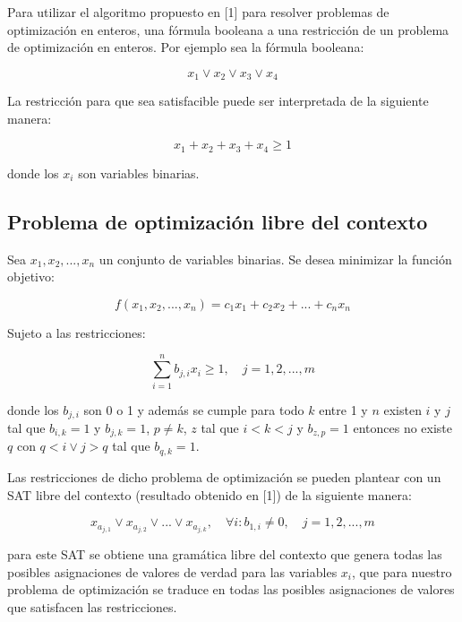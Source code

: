\documentclass{article}
\begin{document}
Para utilizar el algoritmo propuesto en [1] para resolver problemas de optimización en enteros, una fórmula booleana a una restricción de un problema
de optimización en enteros. Por ejemplo sea la fórmula booleana:

\begin{equation}
    x_1 \lor x_2  \lor x_3 \lor x_4
\end{equation}

La restricción para que sea satisfacible puede ser interpretada de la siguiente manera:

\begin{equation}
    x_1 + x_2 + x_3 + x_4 \geq 1
\end{equation}

donde los $x_i$ son variables binarias.

\subsection*{Problema de optimización libre del contexto}

Sea $x_1, x_2, ..., x_n$ un conjunto de variables binarias. Se desea minimizar la función objetivo:

\begin{equation}
    f(x_1, x_2, ..., x_n) = c_1x_1 + c_2x_2 + ... + c_nx_n
\end{equation}

Sujeto a las restricciones:

\begin{equation}
    \sum_{i = 1}^{n} b_{j,i}x_i \geq 1, \quad j = 1, 2, ..., m
\end{equation}

donde los $b_{j,i}$ son 0 o 1 y además se cumple para todo $k$ entre 1 y $n$ existen $i$ y $j$ tal que $b_{i,k} = 1$ y $b_{j,k} = 1$, $p\neq k$, 
$z$ tal que $i<k<j$ y $b_{z,p} = 1$ entonces no existe $q$ con $q<i \lor j>q$ tal que $b_{q,k}=1$.

Las restricciones de dicho problema de optimización se pueden plantear con un SAT libre del contexto (resultado obtenido en [1]) de la siguiente
manera:

\begin{equation}
    x_{a_{j,1}} \lor x_{a_{j,2}} \lor ... \lor x_{a_{j,k}}, \quad \forall i : b_{1,i} \neq 0, \quad j = 1, 2, ..., m
\end{equation} 

para este SAT se obtiene una gramática libre del contexto que genera todas las posibles asignaciones de valores de verdad para las variables $x_i$,
que para nuestro problema de optimización se traduce en todas las posibles asignaciones de valores que satisfacen las restricciones.
\end{document}
